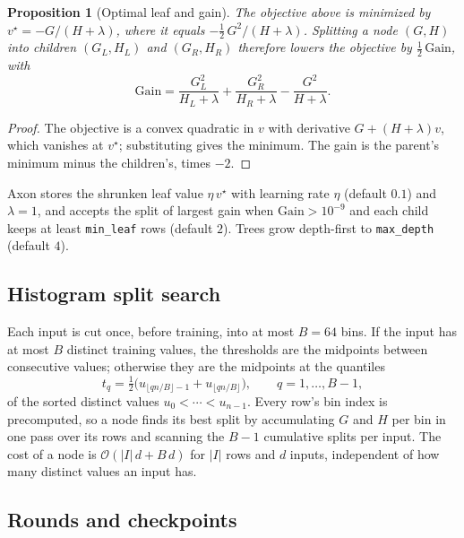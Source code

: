 \documentclass[11pt]{article}
\theoremstyle{plain}
\newtheorem{proposition}{Proposition}[section]
\theoremstyle{definition}
\newcommand{\code}[1]{\texttt{#1}}
\newcommand{\abs}[1]{\left\lvert #1 \right\rvert}
\begin{document}
\begin{proposition}[Optimal leaf and gain]\label{prop:leaf}
The objective above is minimized by $v^\star = -G/(H + \lambda)$, where it
equals $-\tfrac12\,G^2/(H + \lambda)$. Splitting a node $(G, H)$ into children
$(G_L, H_L)$ and $(G_R, H_R)$ therefore lowers the objective by
$\tfrac12\,\mathrm{Gain}$, with
\begin{equation}\label{eq:gain}
  \mathrm{Gain} = \frac{G_L^2}{H_L + \lambda} + \frac{G_R^2}{H_R + \lambda} - \frac{G^2}{H + \lambda}.
\end{equation}
\end{proposition}

\begin{proof}
The objective is a convex quadratic in $v$ with derivative $G + (H + \lambda)v$,
which vanishes at $v^\star$; substituting gives the minimum. The gain is the
parent's minimum minus the children's, times $-2$.
\end{proof}

Axon stores the shrunken leaf value $\eta\,v^\star$ with learning rate $\eta$
(default $0.1$) and $\lambda = 1$, and accepts the split of largest gain when
$\mathrm{Gain} > 10^{-9}$ and each child keeps at least \code{min\_leaf} rows
(default $2$). Trees grow depth-first to \code{max\_depth} (default $4$).

\subsection{Histogram split search}

Each input is cut once, before training, into at most $B = 64$ bins. If the
input has at most $B$ distinct training values, the thresholds are the
midpoints between consecutive values; otherwise they are the midpoints at the
quantiles
\begin{equation}\label{eq:bins}
  t_q = \tfrac12\bigl(u_{\lfloor qn/B\rfloor - 1} + u_{\lfloor qn/B\rfloor}\bigr), \qquad q = 1, \ldots, B - 1,
\end{equation}
of the sorted distinct values $u_0 < \cdots < u_{n-1}$. Every row's bin index is
precomputed, so a node finds its best split by accumulating $G$ and $H$ per bin
in one pass over its rows and scanning the $B - 1$ cumulative splits per input.
The cost of a node is $\mathcal{O}(\abs{I}\,d + B\,d)$ for $\abs{I}$ rows and $d$
inputs, independent of how many distinct values an input has.

\subsection{Rounds and checkpoints}
\end{document}
